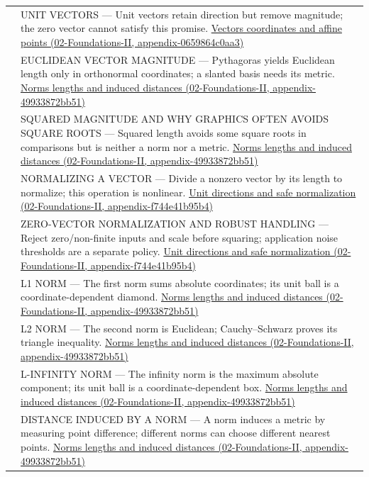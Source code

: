 {\begin{longtable}[]{@{}
  >{\raggedright\arraybackslash}p{}
  >{\raggedright\arraybackslash}p{}@{}}
525 & UNIT VECTORS --- Unit vectors retain direction but remove magnitude; the zero vector cannot satisfy this promise. \href{../02-Foundations-II/main.pdf\#nameddest=appendix-0659864c0aa3}{Vectors coordinates and affine points (02-Foundations-II, appendix-0659864c0aa3)} \\
526 & EUCLIDEAN VECTOR MAGNITUDE --- Pythagoras yields Euclidean length only in orthonormal coordinates; a slanted basis needs its metric. \href{../02-Foundations-II/main.pdf\#nameddest=appendix-49933872bb51}{Norms lengths and induced distances (02-Foundations-II, appendix-49933872bb51)} \\
527 & SQUARED MAGNITUDE AND WHY GRAPHICS OFTEN AVOIDS SQUARE ROOTS --- Squared length avoids some square roots in comparisons but is neither a norm nor a metric. \href{../02-Foundations-II/main.pdf\#nameddest=appendix-49933872bb51}{Norms lengths and induced distances (02-Foundations-II, appendix-49933872bb51)} \\
528 & NORMALIZING A VECTOR --- Divide a nonzero vector by its length to normalize; this operation is nonlinear. \href{../02-Foundations-II/main.pdf\#nameddest=appendix-f744e41b95b4}{Unit directions and safe normalization (02-Foundations-II, appendix-f744e41b95b4)} \\
529 & ZERO-VECTOR NORMALIZATION AND ROBUST HANDLING --- Reject zero/non-finite inputs and scale before squaring; application noise thresholds are a separate policy. \href{../02-Foundations-II/main.pdf\#nameddest=appendix-f744e41b95b4}{Unit directions and safe normalization (02-Foundations-II, appendix-f744e41b95b4)} \\
530 & L1 NORM --- The first norm sums absolute coordinates; its unit ball is a coordinate-dependent diamond. \href{../02-Foundations-II/main.pdf\#nameddest=appendix-49933872bb51}{Norms lengths and induced distances (02-Foundations-II, appendix-49933872bb51)} \\
531 & L2 NORM --- The second norm is Euclidean; Cauchy--Schwarz proves its triangle inequality. \href{../02-Foundations-II/main.pdf\#nameddest=appendix-49933872bb51}{Norms lengths and induced distances (02-Foundations-II, appendix-49933872bb51)} \\
532 & L-INFINITY NORM --- The infinity norm is the maximum absolute component; its unit ball is a coordinate-dependent box. \href{../02-Foundations-II/main.pdf\#nameddest=appendix-49933872bb51}{Norms lengths and induced distances (02-Foundations-II, appendix-49933872bb51)} \\
533 & DISTANCE INDUCED BY A NORM --- A norm induces a metric by measuring point difference; different norms can choose different nearest points. \href{../02-Foundations-II/main.pdf\#nameddest=appendix-49933872bb51}{Norms lengths and induced distances (02-Foundations-II, appendix-49933872bb51)} \\

\end{longtable}}
